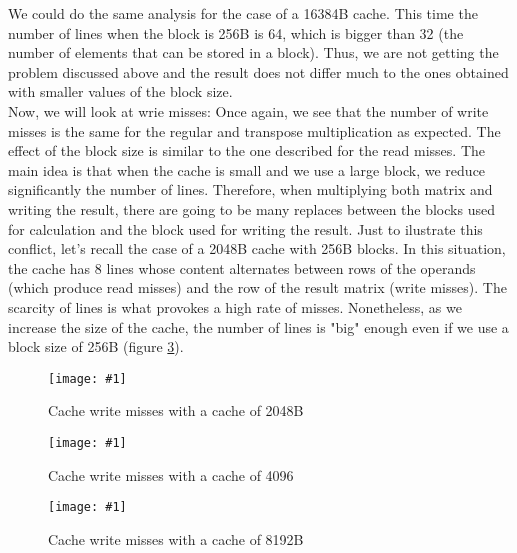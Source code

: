 \documentclass{article}
\newcommand{\myFigure}[4]{%
    \begin{figure}[!ht]
        \texttt{[image: \#1]}
        \centering
        \caption{#2}
        \label{#3}
    \end{figure}
}
\begin{document}
We could do the same analysis for the case of a 16384B cache. This time the number of lines when the block is 256B is 64, which is bigger than 32 (the number of elements that can be stored in a block). Thus, we are not getting the problem discussed above and the result does not differ much to the ones obtained with smaller values of the block size. \\


Now, we will look at wrie misses:
Once again, we see that the number of write misses is the same for the regular and transpose multiplication as expected. The effect of the block size is similar to the one described for the read misses. The main idea is that when the cache is small and we use a large block, we reduce significantly the number of lines. Therefore, when multiplying both matrix and writing the result, there are going to be many replaces between the blocks used for calculation and the block used for writing the result. Just to ilustrate this conflict, let's recall the case of a 2048B cache with 256B blocks. In this situation, the cache has 8 lines whose content alternates between rows of the operands (which produce read misses) and the row of the result matrix (write misses). The scarcity of lines is what provokes a high rate of misses. Nonetheless, as we increase the size of the cache, the number of lines is "big" enough even if we use a block size of 256B (figure \ref{block_8192B_esc}). 


\myFigure{../material_P3/protect_out4/BlockSize_2048/cache_escritura.png}{Cache write misses with a cache of 2048B}{block_2048_esc}{0.55}


\myFigure{../material_P3/protect_out4/BlockSize_4096/cache_escritura.png}{Cache write misses with a cache of 4096}{block_4096_esc}{0.55}

\myFigure{../material_P3/protect_out4/BlockSize_8192/cache_escritura.png}{Cache write misses with a cache of 8192B}{block_8192B_esc}{0.55}

\par
\end{document}
